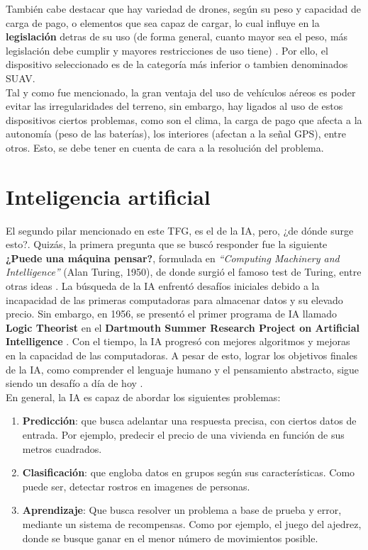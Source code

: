 También cabe destacar que hay variedad de drones, según su peso y capacidad de carga de pago, o elementos que sea capaz de cargar, lo cual influye en la \textbf{legislación} detras de su uso (de forma general, cuanto mayor sea el peso, más legislación debe cumplir y mayores restricciones de uso tiene) \cite{drone-regulation}. Por ello, el dispositivo seleccionado es de la categoría más inferior o tambien denominados \ac{SUAV}.\\

Tal y como fue mencionado, la gran ventaja del uso de vehículos aéreos es poder evitar las irregularidades del terreno, sin embargo, hay ligados al uso de estos dispositivos ciertos problemas, como son el clima, la carga de pago que afecta a la autonomía (peso de las baterías), los interiores (afectan a la señal GPS), entre otros. Esto, se debe tener en cuenta de cara a la resolución del problema.\\

\section{Inteligencia artificial}
\label{subsec:inteligencia_artificial}

El segundo pilar mencionado en este \ac{TFG}, es el de la \ac{IA}, pero, ¿de dónde surge esto?. Quizás, la primera pregunta que se buscó responder fue la siguiente \textbf{¿Puede una máquina pensar?}, formulada en \emph{``Computing Machinery and Intelligence''} (Alan Turing, 1950), de donde surgió el famoso test de Turing, entre otras ideas \cite{turing-paper}. La búsqueda de la \ac{IA} enfrentó desafíos iniciales debido a la incapacidad de las primeras computadoras para almacenar datos y su elevado precio. Sin embargo, en 1956, se presentó el primer programa de \ac{IA} llamado \textbf{Logic Theorist} en el \textbf{Dartmouth Summer Research Project on Artificial Intelligence} \cite{logic-theorist}. Con el tiempo, la IA progresó con mejores algoritmos y mejoras en la capacidad de las computadoras. A pesar de esto, lograr los objetivos finales de la IA, como comprender el lenguaje humano y el pensamiento abstracto, sigue siendo un desafío a día de hoy \cite{history-ai}.\\

En general, la \ac{IA} es capaz de abordar los siguientes problemas:

\begin{enumerate}
	\item \textbf{Predicción}: que busca adelantar una respuesta precisa, con ciertos datos de entrada. Por ejemplo, predecir el precio de una vivienda en función de sus metros cuadrados.

	\item \textbf{Clasificación}: que engloba datos en grupos según sus características. Como puede ser, detectar rostros en imagenes de personas.
	
    \item \textbf{Aprendizaje}: Que busca resolver un problema a base de prueba y error, mediante un sistema de recompensas. Como por ejemplo, el juego del ajedrez, donde se busque ganar en el menor número de movimientos posible.
\end{enumerate} \cite{reg-class}

